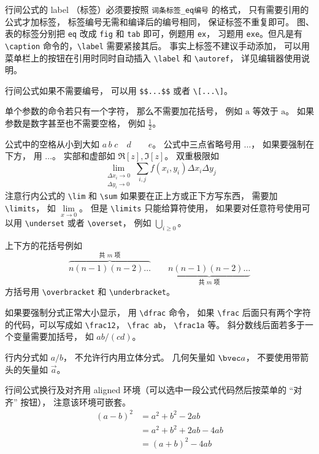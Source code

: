 行间公式的 label （标签）必须要按照 \verb|词条标签_eq编号| 的格式， 只有需要引用的公式才加标签， 标签编号无需和编译后的编号相同， 保证标签不重复即可。 图、表的标签分别把 \verb|eq| 改成 \verb|fig| 和 \verb|tab| 即可，例题用 \verb|ex|， 习题用 \verb|exe|。但凡是有 \verb|\caption| 命令的，\verb|\label| 需要紧接其后。 事实上标签不建议手动添加， 可以用菜单栏上的按钮在引用时同时自动插入 \verb|\label| 和 \verb|\autoref|， 详见编辑器使用说明。

行间公式如果不需要编号， 可以用 \verb|$$...$$| 或者 \verb|\[...\]|。


单个参数的命令若只有一个字符， 那么不需要加花括号， 例如 $\mathrm a$ 等效于 $\mathrm{a}$。 如果参数是数字甚至也不需要空格， 例如 $\frac12$。

公式中的空格从小到大如 $a\, b\; c\quad d\qquad e$。 公式中三点省略号用 $\dots$， 如果要强制在下方， 用 $\ldots$。 实部和虚部如 $\Re[z], \Im[z]$。 双重极限如
\begin{equation}
\lim_{\substack{\Delta x_i\to 0\\ \Delta y_i\to 0}} \sum_{i, j} f(x_i,y_i) \Delta x_i \Delta y_j
\end{equation}
注意行内公式的 \verb|\lim| 和 \verb|\sum| 如果要在正上方或正下方写东西， 需要加 \verb|\limits|， 如 $\lim\limits_{x\to 0}$。 但是 \verb|\limits| 只能给算符使用， 如果要对任意符号使用可以用 \verb|\underset| 或者 \verb|\overset|， 例如 $\underset{i \ge 0}{\bigcup}$。

上下方的花括号例如
\begin{equation}
\overbrace{n(n-1)(n-2)\dots}^{\text{共 $m$ 项}} \qquad \underbrace{n(n-1)(n-2)\dots}_{\text{共 $m$ 项}}
\end{equation}
方括号用 \verb|\overbracket| 和 \verb|\underbracket|。

如果要强制分式正常大小显示， 用 \verb|\dfrac| 命令， 如果 \verb|\frac| 后面只有两个字符的代码，可以写成如 \verb|\frac12|， \verb|\frac ab|， \verb|\frac1a| 等。 斜分数线后面若多于一个变量需要加括号， 如 $ab/(cd)$。

行内分式如 $a/b$， 不允许行内用立体分式。 几何矢量如 $\bvec a$， 不要使用带箭头的矢量如 $\vec a$。 

行间公式换行及对齐用 aligned 环境（可以选中一段公式代码然后按菜单的 “对齐” 按钮）， 注意该环境可嵌套。
\begin{equation}
\begin{aligned}
(a-b)^2 &= a^2+b^2 - 2ab \\
& = a^2+b^2+2ab-4ab\\
& = (a+b)^2-4ab
\end{aligned}
\end{equation}


